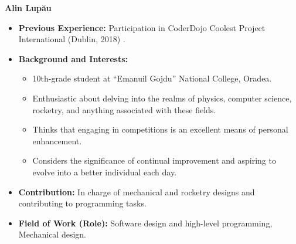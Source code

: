 \item[] \textbf{Alin Lup\u{a}u}
    \begin{itemize}[label=]
        \item[\faCogs] \textbf{Previous Experience:} Participation in CoderDojo Coolest Project International (Dublin, 2018)
.        %
        \item[\faGraduationCap] \textbf{Background and Interests:} 
        \begin{itemize}[label=\textbullet]
            \item 10th-grade student at “Emanuil Gojdu” National College, Oradea.
            \item Enthusiastic about delving into the realms of physics, computer science, rocketry, and anything associated with these fields.
            \item Thinks that engaging in competitions is an excellent means of personal enhancement.
            \item Considers the significance of continual improvement and aspiring to evolve into a better individual each day.
        \end{itemize}
        \item[\faEdit] \textbf{Contribution:} In charge of mechanical and rocketry designs and contributing to programming tasks. 
        \item[\faMicroscope] \textbf{Field of Work (Role):} Software design and high-level programming, Mechanical design.
    \end{itemize}
    \vspace{0.2 cm}
    
